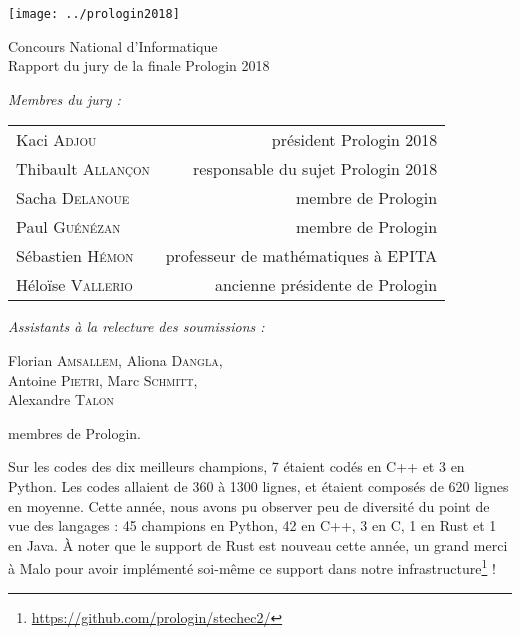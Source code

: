 \documentclass[a4paper,12pt,notitle,noheader,nofooter]{prologin}
\begin{document}
\begin{titlepage}
\begin{center}
\texttt{[image: ../prologin2018]}

\vspace{2.4cm}
{
 \Huge \textsf{Concours National d'Informatique}\\
 \vspace{1em}
 \Large Rapport du jury de la finale Prologin 2018
 \vspace{0.5cm}
}
\end{center}
\textit{Membres du jury :}
\begin{center}
\begin{tabular}{l r}
Kaci \textsc{Adjou} & président Prologin 2018 \\
Thibault \textsc{Allançon} & responsable du sujet Prologin 2018 \\
Sacha \textsc{Delanoue} & membre de Prologin \\
Paul \textsc{Guénézan} & membre de Prologin \\
Sébastien \textsc{Hémon} & professeur de mathématiques à EPITA \\
Héloïse \textsc{Vallerio} & ancienne présidente de Prologin
\end{tabular}
\end{center}
\textit{Assistants à la relecture des soumissions :}
\begin{center}
Florian \textsc{Amsallem}, Aliona \textsc{Dangla}, \\
Antoine \textsc{Pietri}, Marc \textsc{Schmitt}, \\
Alexandre \textsc{Talon}

\end{center}
\quad membres de Prologin.
\end{titlepage}


Sur les codes des dix meilleurs champions, 7 étaient codés en C++ et 3 en
Python. Les codes allaient de 360 à 1300 lignes, et étaient composés de 620
lignes en moyenne. Cette année, nous avons pu observer peu de diversité du point
de vue des langages : 45 champions en Python, 42 en C++, 3 en C, 1 en Rust et 1
en Java. À noter que le support de Rust est nouveau cette année, un grand merci
à Malo pour avoir implémenté soi-même ce support dans notre
infrastructure\footnote{\url{https://github.com/prologin/stechec2/}} !

\bigbreak
\end{document}
